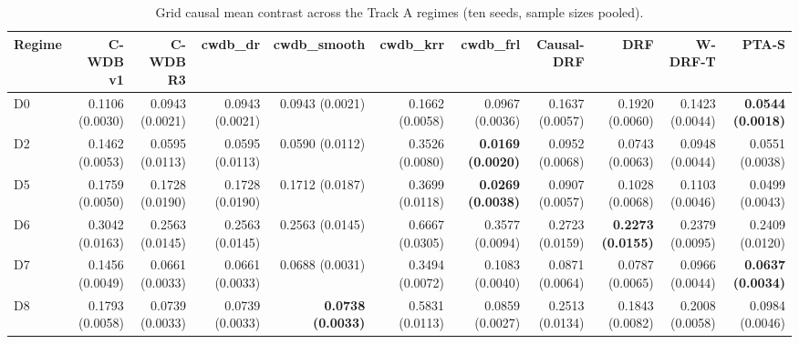 \begin{table}[htbp]
\centering
\caption{Grid causal mean contrast across the Track A regimes (ten seeds, sample sizes pooled).}
\label{tab:p6-trackA-mean_quantile_rmse}
\small
\begin{tabular}{@{}lrrrrrrrrrr@{}}
\toprule
Regime & C-WDB v1 & C-WDB R3 & cwdb\_dr & cwdb\_smooth & cwdb\_krr & cwdb\_frl & Causal-DRF & DRF & W-DRF-T & PTA-S \\ 
\midrule
D0 & 0.1106 (0.0030) & 0.0943 (0.0021) & 0.0943 (0.0021) & 0.0943 (0.0021) & 0.1662 (0.0058) & 0.0967 (0.0036) & 0.1637 (0.0057) & 0.1920 (0.0060) & 0.1423 (0.0044) & \textbf{0.0544 (0.0018)} \\ 
D2 & 0.1462 (0.0053) & 0.0595 (0.0113) & 0.0595 (0.0113) & 0.0590 (0.0112) & 0.3526 (0.0080) & \textbf{0.0169 (0.0020)} & 0.0952 (0.0068) & 0.0743 (0.0063) & 0.0948 (0.0044) & 0.0551 (0.0038) \\ 
D5 & 0.1759 (0.0050) & 0.1728 (0.0190) & 0.1728 (0.0190) & 0.1712 (0.0187) & 0.3699 (0.0118) & \textbf{0.0269 (0.0038)} & 0.0907 (0.0057) & 0.1028 (0.0068) & 0.1103 (0.0046) & 0.0499 (0.0043) \\ 
D6 & 0.3042 (0.0163) & 0.2563 (0.0145) & 0.2563 (0.0145) & 0.2563 (0.0145) & 0.6667 (0.0305) & 0.3577 (0.0094) & 0.2723 (0.0159) & \textbf{0.2273 (0.0155)} & 0.2379 (0.0095) & 0.2409 (0.0120) \\ 
D7 & 0.1456 (0.0049) & 0.0661 (0.0033) & 0.0661 (0.0033) & 0.0688 (0.0031) & 0.3494 (0.0072) & 0.1083 (0.0040) & 0.0871 (0.0064) & 0.0787 (0.0065) & 0.0966 (0.0044) & \textbf{0.0637 (0.0034)} \\ 
D8 & 0.1793 (0.0058) & 0.0739 (0.0033) & 0.0739 (0.0033) & \textbf{0.0738 (0.0033)} & 0.5831 (0.0113) & 0.0859 (0.0027) & 0.2513 (0.0134) & 0.1843 (0.0082) & 0.2008 (0.0058) & 0.0984 (0.0046) \\ 
\bottomrule
\end{tabular}
\end{table}



